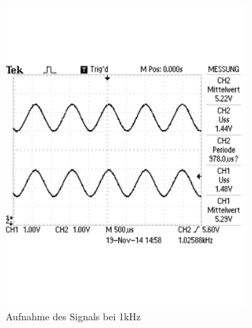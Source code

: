 \documentclass[12pt,a4paper]{article}
\begin{document}
\begin{figure}[H]
\begin{subfigure}[b]{0.28\textwidth}
                \includegraphics[width=\textwidth , scale = 0.4]{2_2_1k.pdf}
                \caption[Aufnahme des Signals bei 1kHz]{Aufnahme des Signals bei 1kHz}
                \label{fig:2_2_1k}
        \end{subfigure}
        \hfill
        \begin{subfigure}[b]{0.28\textwidth}

\end{subfigure}
\end{figure}
\end{document}
